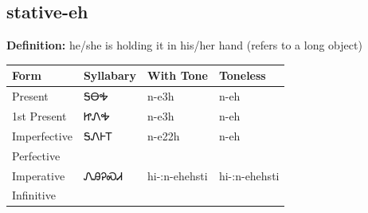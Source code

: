 \documentclass{article}%
\begin{document}
\subsection*{stative-eh}%
\textbf{Definition: }%
he/she is holding it in his/her hand (refers to a long object)%
\\[0.5em]%
\begin{tabular}{|l|l|l|l|}%
\hline%
\textbf{Form}&\textbf{Syllabary}&\textbf{With Tone}&\textbf{Toneless}\\%
\hline%
Present&ᎦᎾᎭ&n{-}e3h&n{-}eh\\%
1st Present&ᏥᏁᎭ&n{-}e3h&n{-}eh\\%
Imperfective&ᎦᏁᎰᎢ&n{-}e22h&n{-}eh\\%
Perfective&&&\\%
Imperative&ᏁᎯᎮᏍᏗ&hi{-}:n{-}ehehsti&hi{-}:n{-}ehehsti\\%
Infinitive&&&\\%
\hline%
\end{tabular}%
\\[1em]%
\end{document}
